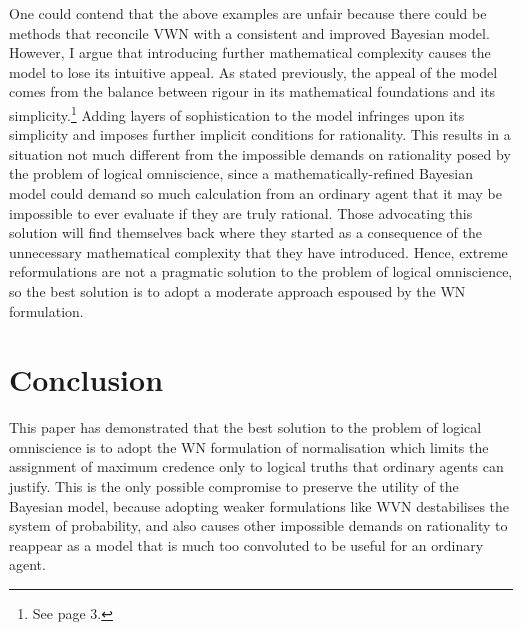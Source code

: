 \documentclass[12pt]{article}
\begin{document}
One could contend that the above examples are unfair because there could be methods that reconcile VWN with a consistent and improved Bayesian model. However, I argue that introducing further mathematical complexity causes the model to lose its intuitive appeal. As stated previously, the appeal of the model comes from the balance between rigour in its mathematical foundations and its simplicity.\footnote{See page 3.} Adding layers of sophistication to the model infringes upon its simplicity and imposes further implicit conditions for rationality. This results in a situation not much different from the impossible demands on rationality posed by the problem of logical omniscience, since a mathematically-refined Bayesian model could demand so much calculation from an ordinary agent that it may be impossible to ever evaluate if they are truly rational. Those advocating this solution will find themselves back where they started as a consequence of the unnecessary mathematical complexity that they have introduced. Hence, extreme reformulations are not a pragmatic solution to the problem of logical omniscience, so the best solution is to adopt a moderate approach espoused by the WN formulation.
\section{Conclusion}
This paper has demonstrated that the best solution to the problem of logical omniscience is to adopt the WN formulation of normalisation which limits the assignment of maximum credence only to logical truths that ordinary agents can justify. This is the only possible compromise to preserve the utility of the Bayesian model, because adopting weaker formulations like WVN destabilises the system of probability, and also causes other impossible demands on rationality to reappear as a model that is much too convoluted to be useful for an ordinary agent.
\pagebreak
\printbibliography
\end{document}
